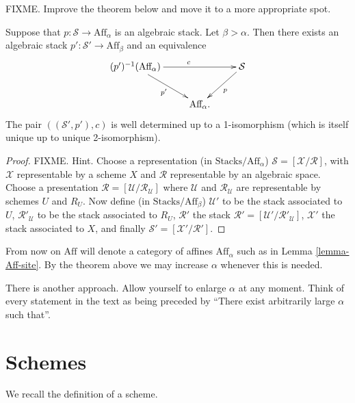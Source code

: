 \medskip\noindent
FIXME. Improve the theorem below and move it to a more appropriate spot.

\begin{theorem}
\label{theorem-change-alpha}
Suppose that $p : \mathcal{S} \to \text{Aff}_\alpha$ is an algebraic stack.
Let $\beta > \alpha$. Then there exists an algebraic stack
$p' : \mathcal{S}' \to \text{Aff}_\beta$ and an equivalence
$$
\xymatrix{
(p')^{-1}(\text{Aff}_\alpha) \ar[rd]_{p'} \ar[rr]^c && \mathcal{S}\ar[ld]^p\\
&\text{Aff}_\alpha.&}
$$
The pair $((\mathcal{S'},p'),c)$ is well determined up to a 1-isomorphism
(which is itself unique up to unique 2-isomorphism).
\end{theorem}

\begin{proof}
FIXME. Hint. Choose a representation (in $\text{Stacks}/\text{Aff}_\alpha$)
$\mathcal{S} = [ \mathcal{X}/\mathcal{R} ]$, with $\mathcal{X}$ representable
by a scheme $X$ and $\mathcal{R}$ representable by an algebraic space.
Choose a presentation $\mathcal{R} = [ \mathcal{U}/\mathcal{R}_\mathcal{U} ]$
where $\mathcal{U}$ and $\mathcal{R}_\mathcal{U}$ are representable
by schemes $U$ and $R_U$. Now define (in $\text{Stacks}/\text{Aff}_\beta$)
$\mathcal{U}'$ to be the stack associated to $U$, $\mathcal{R}'_\mathcal{U}$
to be the stack associated to $R_U$, $\mathcal{R}'$ the stack
$\mathcal{R}' = [ \mathcal{U}'/\mathcal{R}'_\mathcal{U} ]$, $\mathcal{X}'$
the stack associated to $X$, and finally
$\mathcal{S}' = [ \mathcal{X}'/\mathcal{R}' ]$.
\end{proof}

\noindent
From now on $\text{Aff}$ will denote a category of affines $\text{Aff}_\alpha$
such as in Lemma \ref{lemma-Aff-site}. By the theorem above we may increase
$\alpha$ whenever this is needed.

\begin{remark}
\label{remark-other-approach}
There is another approach. Allow yourself to enlarge $\alpha$ at any moment.
Think of every statement in the text as being preceded by ``There exist
arbitrarily large $\alpha$ such that''. 
\end{remark}

\section{Schemes}
\label{section-schemes}

\noindent
We recall the definition of a scheme.


